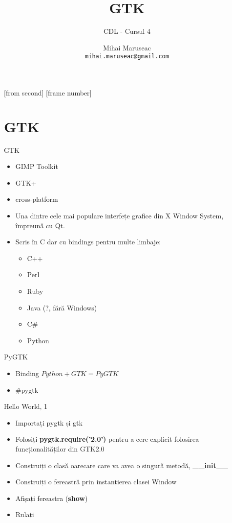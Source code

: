 \documentclass{beamer}
\title[GTK]{GTK}
\subtitle{CDL - Cursul 4}
\institute{ROSEdu}
\author{Mihai Maruseac \\\texttt{mihai.maruseac@gmail.com}}
\begin{document}
[from second]
[frame number]

\frame{\titlepage}

\frame{\tableofcontents}

\section{GTK}
\frame{\tableofcontents[currentsection]}

\begin{frame}{GTK}
\begin{itemize}
\item GIMP Toolkit
\item GTK+
\item cross-platform
\item Una dintre cele mai populare interfețe grafice din X Window System, împreună cu Qt.
\item \pause Scris în C dar cu bindings pentru multe limbaje:
	\begin{itemize}
		\item C++
		\item Perl
		\item Ruby
		\item Java (?, fără Windows)
		\item C\#
		\item Python
	\end{itemize}
\end{itemize}
\end{frame}

\begin{frame}{PyGTK}
\begin{itemize}
	\item Binding $Python + GTK = PyGTK$
	\vspace{2cm}
	\item\pause\#pygtk
\end{itemize}
\end{frame}

\begin{frame}{Hello World, 1}
\begin{itemize}
	\item Importați pygtk și gtk
	\item \pause Folosiți\linebreak
		{\bfseries pygtk.require('2.0')}\linebreak
		pentru a cere explicit folosirea funcționalităților din GTK2.0
	\item \pause Construiți o clasă oarecare care va avea o singură metodă, {\bfseries \_\_init\_\_}
	\item \pause Construiți o fereastră prin instanțierea clasei Window
	\item \pause Afișați fereastra ({\bfseries show})
	\item \pause Rulați
\end{itemize}
\end{frame}
\end{document}
